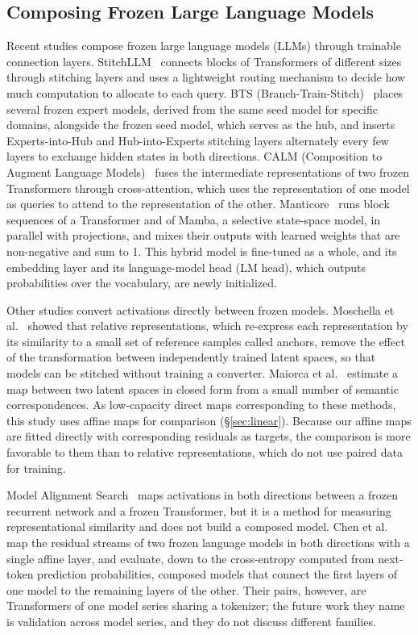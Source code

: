 \documentclass[conference]{IEEEtran}
\begin{document}
\subsection{Composing Frozen Large Language Models}
Recent studies compose frozen large language models (LLMs) through trainable connection layers.
StitchLLM~\cite{hu-etal-2025-stitchllm} connects blocks of Transformers of different sizes through stitching layers and uses a
lightweight routing mechanism to decide how much computation to allocate to each query. BTS (Branch-Train-Stitch)~\cite{zhang-etal-2025-bts}
places several frozen expert models, derived from the same seed model for specific domains, alongside the frozen seed model, which serves as the hub, and
inserts Experts-into-Hub and Hub-into-Experts stitching layers alternately every few layers to exchange hidden states in both
directions. CALM (Composition to Augment Language Models)~\cite{bansal2024llm} fuses the intermediate representations of two frozen
Transformers through cross-attention, which uses the representation of one model as queries to attend to the representation of the
other. Manticore~\cite{roberts2025pretrained} runs block sequences of a Transformer and of Mamba, a selective state-space model, in
parallel with projections, and mixes their outputs with learned weights that are non-negative and sum to 1. This hybrid model is
fine-tuned as a whole, and its embedding layer and its language-model head (LM head), which outputs probabilities over the vocabulary,
are newly initialized.

Other studies convert activations directly between frozen models. Moschella et al.~\cite{moschella2023relative} showed that
relative representations, which re-express each representation by its similarity to a small set of reference samples called anchors,
remove the effect of the transformation between independently trained latent spaces, so that models can be stitched without training a converter.
Maiorca et al.~\cite{3666122.3668540} estimate a map between two latent spaces in closed form from a small number of semantic
correspondences. As low-capacity direct maps corresponding to these methods, this study uses affine maps for comparison
(\S\ref{sec:linear}). Because our affine maps are fitted directly with corresponding residuals as targets, the comparison is more
favorable to them than to relative representations, which do not use paired data for training.

Model Alignment Search~\cite{grant2025model} maps activations in both directions between a frozen recurrent network and a frozen
Transformer, but it is a method for measuring representational similarity and does not build a composed model.
Chen et al.~\cite{chen2025transferring} map the residual streams of two frozen language models in both directions with a single
affine layer, and evaluate, down to the cross-entropy computed from next-token prediction probabilities, composed models that connect the
first layers of one model to the remaining layers of the other. Their pairs, however, are Transformers of one model series sharing
a tokenizer; the future work they name is validation across model series, and they do not discuss different families.
\end{document}
